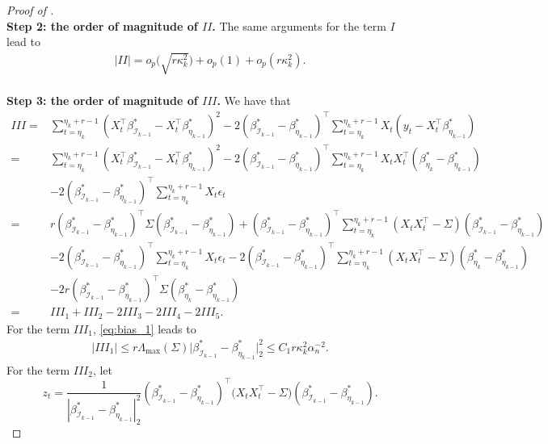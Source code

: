 \documentclass[11pt]{article}
\theoremstyle{plain}
\theoremstyle{definition}
\begin{document}
\begin{proof}[Proof of ]
\
\\
\textbf{Step 2: the order of magnitude of $II$.} The same arguments for the term $I$ lead to
\begin{align}\label{eq:refine_noise2}
    |II| = o_p\Big(\sqrt{r\kappa_k^2}\Big) + o_p(1) + o_p(r\kappa_k^2).
\end{align}
\
\\
\textbf{Step 3: the order of magnitude of $III$.} We have that
\begin{align*}
    III =& \sum_{t = \eta_k}^{\eta_k + r - 1}(X_t^{\top}\beta^*_{\mathcal{I}_{k-1}} - X_t^{\top}\beta^*_{\eta_{k-1}})^2 - 2(\beta^*_{\mathcal{I}_{k-1}} - \beta^*_{\eta_{k-1}})^{\top}\sum_{t = \eta_k}^{\eta_k + r - 1}X_t(y_t - X_t^{\top}\beta_{\eta_{k-1}}^*)\\
    =& \sum_{t = \eta_k}^{\eta_k + r - 1}(X_t^{\top}\beta^*_{\mathcal{I}_{k-1}} - X_t^{\top}\beta^*_{\eta_{k-1}})^2 - 2(\beta^*_{\mathcal{I}_{k-1}} - \beta^*_{\eta_{k-1}})^{\top}\sum_{t = \eta_k}^{\eta_k + r - 1}X_tX_t^{\top}(\beta_{\eta_{k}}^* - \beta_{\eta_{k-1}}^*)\\
    &- 2(\beta^*_{\mathcal{I}_{k-1}} - \beta^*_{\eta_{k-1}})^{\top}\sum_{t = \eta_k}^{\eta_k + r - 1}X_t\epsilon_t\\
    =& r(\beta^*_{\mathcal{I}_{k-1}} - \beta^*_{\eta_{k-1}})^{\top}\Sigma(\beta^*_{\mathcal{I}_{k-1}} - \beta^*_{\eta_{k-1}}) + (\beta^*_{\mathcal{I}_{k-1}} - \beta^*_{\eta_{k-1}})^{\top}\sum_{t = \eta_k}^{\eta_k + r - 1}(X_tX_t^{\top}-\Sigma)(\beta^*_{\mathcal{I}_{k-1}} - \beta^*_{\eta_{k-1}})\\
    &- 2(\beta^*_{\mathcal{I}_{k-1}} - \beta^*_{\eta_{k-1}})^{\top}\sum_{t = \eta_k}^{\eta_k + r - 1}X_t\epsilon_t - 2(\beta^*_{\mathcal{I}_{k-1}} - \beta^*_{\eta_{k-1}})^{\top}\sum_{t = \eta_k}^{\eta_k + r - 1}(X_tX_t^{\top}-\Sigma)(\beta_{\eta_{k}}^* - \beta_{\eta_{k-1}}^*)\\
    &- 2r(\beta^*_{\mathcal{I}_{k-1}} - \beta^*_{\eta_{k-1}})^{\top}\Sigma(\beta_{\eta_{k}}^* - \beta_{\eta_{k-1}}^*)\\
    =&III_1 + III_2 - 2III_3 - 2III_4 - 2III_5. 
\end{align*}
For the term $III_1$, \eqref{eq:bias_1} leads to
\begin{align*}
    |III_1| \leq r\Lambda_{\max}(\Sigma)\big|\beta^*_{\mathcal{I}_{k-1}} - \beta^*_{\eta_{k-1}} \big|_2^2 \leq C_1r\kappa_k^2\alpha_n^{-2}.
\end{align*}
For the term $III_2$, let $$z_t = \frac{1}{|\beta^*_{\mathcal{I}_{k-1}} - \beta^*_{\eta_{k-1}}|_2^2}(\beta^*_{\mathcal{I}_{k-1}} - \beta^*_{\eta_{k-1}})^{\top}\big(X_tX_t^{\top} - \Sigma\big)(\beta^*_{\mathcal{I}_{k-1}} - \beta^*_{\eta_{k-1}}).$$

\end{proof}
\end{document}
